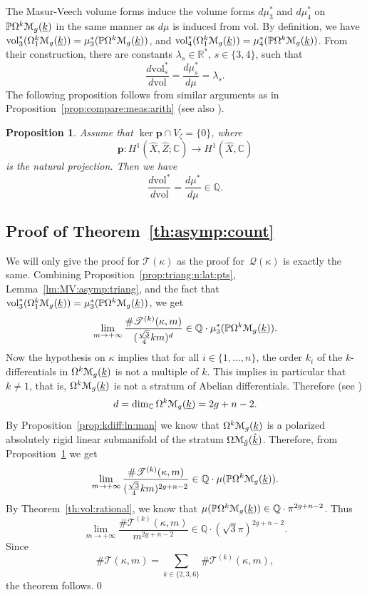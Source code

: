 \documentclass[11pt]{article}
\numberwithin{equation}{section}
\let\mathcal\EuScript
\theoremstyle{plain}
\newtheorem{Proposition}[Theorem]{Proposition}
\theoremstyle{definition}
\newcommand{\R}{\mathbb{R}}
\def\C{\mathbb{C}}
\newcommand{\Q}{\mathbb{Q}}
\newcommand{\Pb}{\mathbb{P}}
\newcommand{\pp}{\boldsymbol{p}}
\newcommand{\Mcal}{\mathcal{M}}
\newcommand{\QQ}{\mathscr{Q}}
\newcommand{\TT}{\mathscr{T}}
\newcommand{\vol}{\mathrm{vol}}
\newcommand{\hX}{\hat{X}}
\newcommand{\hZ}{\hat{Z}}
\let\ul\underline
\newcommand{\Skdiff}{\Omega^k\mathcal{M}_{g}(\ul{k})}
\newcommand{\Skdiffi}{\Omega^k_1\mathcal{M}_{g}(\ul{k})}
\newcommand{\Sabel}{\Omega\Mcal_{\hat{g}}(\ul{\hat{k}})}
\newcommand{\pSkdiff}{\Pb\Omega^k\mathcal{M}_{g}(\ul{k})}
\begin{document}
The Masur-Veech volume forms induce the volume forms $d\mu_3^*$ and $d\mu_4^*$ on $\pSkdiff$ in the same manner as $d\mu$ is induced from $\vol$.
By definition, we have $\vol_3^*(\Skdiffi)=\mu^*_3(\pSkdiff)$, and $\vol_4^*(\Skdiffi)=\mu^*_4(\pSkdiff)$.
From their construction, there are constants $\lambda_s \in \R^*, \, s\in \{3,4\}$, such that
\[
\frac{d\vol_s^*}{d\vol}=\frac{d\mu_s^*}{d\mu}=\lambda_s.
\]
The following proposition follows from similar arguments as in Proposition~\ref{prop:compare:meas:arith} (see also \cite[]{Ngu19}).
\begin{Proposition}\label{prop:ratio:vol:forms}
Assume that $\ker\pp\cap V_\zeta=\{0\}$, where
\[
\pp: H^1(\hX,\hZ;\C) \to H^1(\hX,\C)
\]
is the natural projection. Then we have
\[
\frac{d\vol^*}{d\vol}=\frac{d\mu^*}{d\mu} \in \Q.
\]
\end{Proposition}

\subsection{Proof of Theorem~\ref{th:asymp:count}}
We will only give the proof for $\TT(\kappa)$ as the proof for~$\QQ(\kappa)$ is exactly the same.
Combining Proposition~\ref{prop:triang:n:lat:pts}, Lemma~\ref{lm:MV:asymp:triang}, and the fact that $\vol^*_3(\Skdiffi)=\mu^*_3(\pSkdiff)$, we get
\[
\lim_{m\to +\infty}\frac{\#\TT^{(k)}(\kappa,m)}{(\frac{\sqrt{3}}{4}km)^d} \in \Q\cdot\mu_3^*(\pSkdiff).
\]
Now the hypothesis on $\kappa$ implies that for all $i\in \{1,\dots,n\}$, the order $k_i$ of the $k$\nobreakdash-dif\-ferentials in $\Skdiff$ is not a multiple of $k$. This implies in particular that $k\neq 1$, that is, $\Skdiff$ is not a stratum of Abelian differentials. Therefore (see \cite{BCGGM:kdiff, Ngu19})
\[
d=\dim_\C\Skdiff=2g+n-2.
\]
By Proposition~\ref{prop:kdiff:ln:man} we know that $\Skdiff$ is a polarized absolutely rigid linear submanifold of the stratum $\Sabel$.
Therefore, from Proposition~\ref{prop:ratio:vol:forms} we get
\[
\lim_{m\to +\infty}\frac{\#\TT^{(k)}(\kappa,m)}{(\frac{\sqrt{3}}{4}km)^{2g+n-2}} \in \Q\cdot\mu(\pSkdiff).
\]
By Theorem~\ref{th:vol:rational}, we know that $\mu(\pSkdiff) \in \Q\cdot\pi^{2g+n-2}$. Thus
\[
\lim_{m\to +\infty}\frac{\#\TT^{(k)}(\kappa,m)}{m^{2g+n-2}} \in \Q\cdot(\sqrt{3}\pi)^{2g+n-2}.
\]
Since
\[
\#\TT(\kappa,m)=\sum_{k\in\{2,3,6\}} \#\TT^{(k)}(\kappa,m),
\]
the theorem follows.\qed

\end{document}
